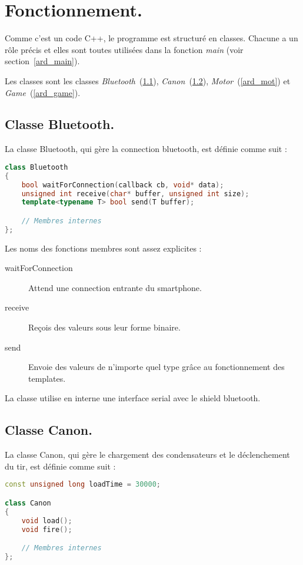 \section{Fonctionnement.}
Comme c'est un code C++, le programme est structuré en classes. Chacune a un rôle précis et elles sont toutes utilisées dans la fonction \emph{main} (voir section~\ref{ard_main}).

Les classes sont les classes \emph{Bluetooth}~(\ref{ard_bt}), \emph{Canon}~(\ref{ard_can}), \emph{Motor}~(\ref{ard_mot}) et \emph{Game}~(\ref{ard_game}).

\subsection{Classe Bluetooth.} \label{ard_bt}
La classe Bluetooth, qui gère la connection bluetooth, est définie comme suit :
\begin{lstlisting}[language=C++]
class Bluetooth
{
	bool waitForConnection(callback cb, void* data);
	unsigned int receive(char* buffer, unsigned int size);
	template<typename T> bool send(T buffer);

	// Membres internes
};
\end{lstlisting}

Les noms des fonctions membres sont assez explicites :\begin{description}
	\item[waitForConnection] Attend une connection entrante du smartphone.
	\item[receive] Reçois des valeurs sous leur forme binaire.
	\item[send] Envoie des valeurs de n'importe quel type grâce au fonctionnement des templates.
\end{description}

La classe utilise en interne une interface serial avec le shield bluetooth.

\subsection{Classe Canon.} \label{ard_can}
La classe Canon, qui gère le chargement des condensateurs et le déclenchement du tir, est définie comme suit :
\begin{lstlisting}[language=C++]
const unsigned long loadTime = 30000;

class Canon
{
	void load();
	void fire();

	// Membres internes
};
\end{lstlisting}

